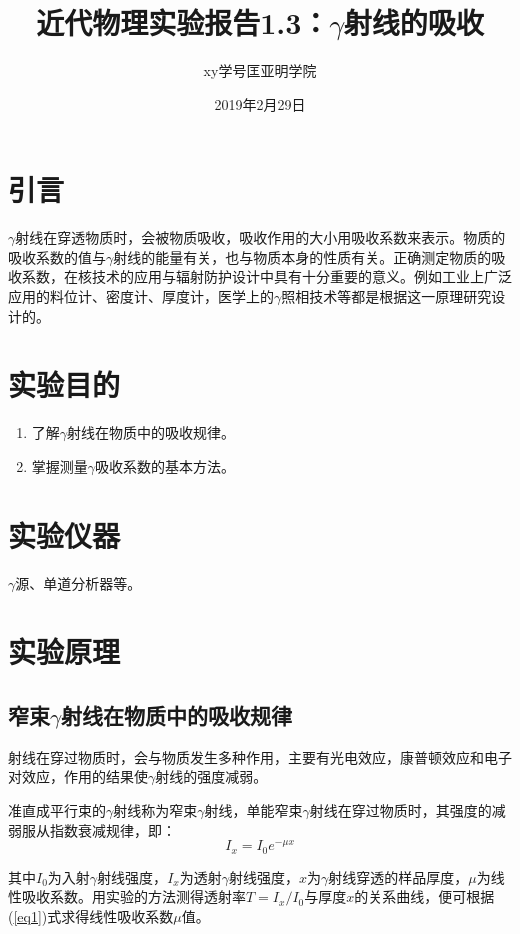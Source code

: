 \documentclass[a4paper]{article}
\title{近代物理实验报告1.3：$\gamma$射线的吸收}
\author{xy\quad 学号\quad 匡亚明学院}
\date{2019年2月29日}
\begin{document}
\maketitle


\section{引言}
$\gamma$射线在穿透物质时，会被物质吸收，吸收作用的大小用吸收系数来表示。物质的吸收系数的值与$\gamma$射线的能量有关，也与物质本身的性质有关。正确测定物质的吸收系数，在核技术的应用与辐射防护设计中具有十分重要的意义。例如工业上广泛应用的料位计、密度计、厚度计，医学上的$\gamma$照相技术等都是根据这一原理研究设计的。

\section{实验目的}
\begin{enumerate}
    \item 了解$\gamma$射线在物质中的吸收规律。
    \item 掌握测量$\gamma$吸收系数的基本方法。
\end{enumerate}

\section{实验仪器}
$\gamma$源、单道分析器等。

\section{实验原理}

\subsection{窄束$\gamma$射线在物质中的吸收规律}
射线在穿过物质时，会与物质发生多种作用，主要有光电效应，康普顿效应和电子对效应，作用的结果使$\gamma$射线的强度减弱。

准直成平行束的$\gamma$射线称为窄束$\gamma$射线，单能窄束$\gamma$射线在穿过物质时，其强度的减弱服从指数衰减规律，即：
\begin{equation}
    I_x = I_0e^{-\mu x}\label{eq1}
\end{equation}

其中$I_0$为入射$\gamma$射线强度，$I_x$为透射$\gamma$射线强度，$x$为$\gamma$射线穿透的样品厚度，$\mu$为线性吸收系数。用实验的方法测得透射率$T = I_x/I_0$与厚度$x$的关系曲线，便可根据(\ref{eq1})式求得线性吸收系数$\mu$值。
\end{document}
